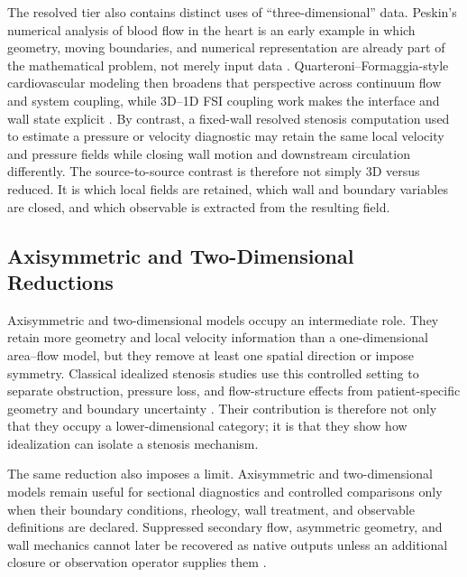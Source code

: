 The resolved tier also contains distinct uses of ``three-dimensional'' data.
Peskin's numerical analysis of blood flow in the heart is an early example in
which geometry, moving boundaries, and numerical representation are already
part of the mathematical problem, not merely input data
\cite{Peskin1977NumericalAnalysisBloodFlowHeart}. Quarteroni--Formaggia-style
cardiovascular modeling then broadens that perspective across continuum flow
and system coupling, while 3D--1D FSI coupling work makes the interface and
wall state explicit
\cite{QuarteroniFormaggia2004CardiovascularModeling,FormaggiaEtAl2007FSICoupling}.
By contrast, a fixed-wall resolved stenosis computation used to estimate a
pressure or velocity diagnostic may retain the same local velocity and pressure
fields while closing wall motion and downstream circulation differently. The
source-to-source contrast is therefore not simply 3D versus reduced. It is
which local fields are retained, which wall and boundary variables are closed,
and which observable is extracted from the resulting field.

\subsection{Axisymmetric and Two-Dimensional Reductions}
\label{subsec:axisymmetric-two-dimensional-models}

Axisymmetric and two-dimensional models occupy an intermediate role. They
retain more geometry and local velocity information than a one-dimensional
area--flow model, but they remove at least one spatial direction or impose
symmetry. Classical idealized stenosis studies use this controlled setting to
separate obstruction, pressure loss, and flow-structure effects from
patient-specific geometry and boundary uncertainty
\cite{YoungTsai1973SteadyStenosis,YoungTsai1973UnsteadyStenosis}. Their
contribution is therefore not only that they occupy a lower-dimensional
category; it is that they show how idealization can isolate a stenosis
mechanism.

The same reduction also imposes a limit. Axisymmetric and two-dimensional
models remain useful for sectional diagnostics and controlled comparisons only
when their boundary conditions, rheology, wall treatment, and observable
definitions are declared. Suppressed secondary flow, asymmetric geometry, and
wall mechanics cannot later be recovered as native outputs unless an additional
closure or observation operator supplies them
\cite{GaldiEtAl2008HemodynamicalFlows,KopplHelmig2023DimensionReducedModeling}.

